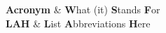 

{
\textbf{Acronym} & \textbf{W}hat (it) \textbf{S}tands \textbf{F}or \\
\textbf{LAH} & \textbf{L}ist \textbf{A}bbreviations \textbf{H}ere \\
}
